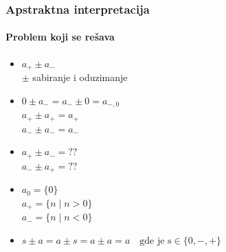 \documentclass[xetex,mathserif,serif]{beamer}
\begin{document}
  
  


  
  
\begin{frame}
	\frametitle{Apstraktna interpretacija}
	\framesubtitle{Problem koji se rešava}
	\begin{multicols}{2}
	\begin{itemize}
     \item $a_{+} \pm a_{-}$ \\
     {\color{cyan} $\pm$ sabiranje i oduzimanje}
     
     \item $0 \pm a_{-} = a_{-} \pm 0 = a_{-,0} $ \\
      $a_{+} \pm a_{+} = a_{+}$ \\
      $a_{-} \pm a_{-} = a_{-}$ \\
    
    \pause 
     
     \item $a_{+} \pm a_{-} = ??$ \\
      $a_{-} \pm a_{+} = ??$
     
	\pause     
     
     \item $a_{0} = \{0\}$ \\
      $a_{+} = \{n \mid n > 0\}$ \\
      $a_{-} = \{n \mid n < 0\}$
    
    \end{itemize}
    \end{multicols}

	\pause

	\begin{itemize}
		\item $s \pm a = a \pm s = a \pm a = a \quad \text{gde je s} \in \{0, -, +\}$
	\end{itemize}	       
\end{frame}  
\end{document}
